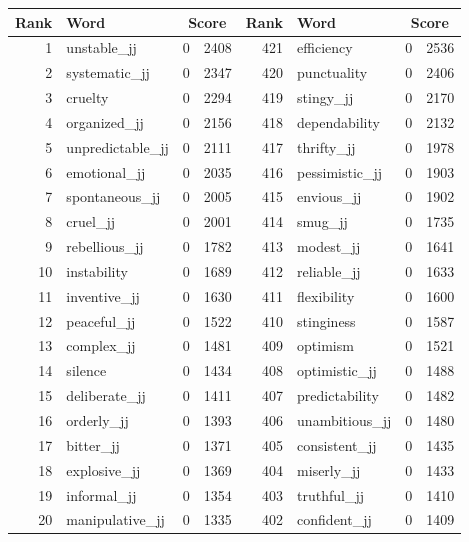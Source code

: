 \begin{table}[tbp]
    \begin{tabular}{| rlr@{.}l | rlr@{.}l |}
    \hline
    \textbf{Rank} & \textbf{Word} & \multicolumn{2}{c|}{\textbf{Score}} & \textbf{Rank} & \textbf{Word} & \multicolumn{2}{c|}{\textbf{Score}} \\
    \hline
    1 & unstable\_jj & 0 & 2408    &    421 & efficiency & 0 & 2536 \\
    2 & systematic\_jj & 0 & 2347    &    420 & punctuality & 0 & 2406 \\
    3 & cruelty & 0 & 2294    &    419 & stingy\_jj & 0 & 2170 \\
    4 & organized\_jj & 0 & 2156    &    418 & dependability & 0 & 2132 \\
    5 & unpredictable\_jj & 0 & 2111    &    417 & thrifty\_jj & 0 & 1978 \\
    6 & emotional\_jj & 0 & 2035    &    416 & pessimistic\_jj & 0 & 1903 \\
    7 & spontaneous\_jj & 0 & 2005    &    415 & envious\_jj & 0 & 1902 \\
    8 & cruel\_jj & 0 & 2001    &    414 & smug\_jj & 0 & 1735 \\
    9 & rebellious\_jj & 0 & 1782    &    413 & modest\_jj & 0 & 1641 \\
    10 & instability & 0 & 1689    &    412 & reliable\_jj & 0 & 1633 \\
    11 & inventive\_jj & 0 & 1630    &    411 & flexibility & 0 & 1600 \\
    12 & peaceful\_jj & 0 & 1522    &    410 & stinginess & 0 & 1587 \\
    13 & complex\_jj & 0 & 1481    &    409 & optimism & 0 & 1521 \\
    14 & silence & 0 & 1434    &    408 & optimistic\_jj & 0 & 1488 \\
    15 & deliberate\_jj & 0 & 1411    &    407 & predictability & 0 & 1482 \\
    16 & orderly\_jj & 0 & 1393    &    406 & unambitious\_jj & 0 & 1480 \\
    17 & bitter\_jj & 0 & 1371    &    405 & consistent\_jj & 0 & 1435 \\
    18 & explosive\_jj & 0 & 1369    &    404 & miserly\_jj & 0 & 1433 \\
    19 & informal\_jj & 0 & 1354    &    403 & truthful\_jj & 0 & 1410 \\
    20 & manipulative\_jj & 0 & 1335    &    402 & confident\_jj & 0 & 1409 \\

\end{tabular}
\end{table}
